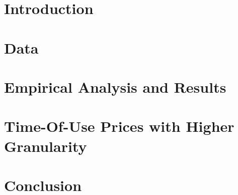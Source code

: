 \section{Introduction}
\label{Section:Introduction}



\section{Data}
\label{Section:Data}



\section{Empirical Analysis and Results}
\label{Section:Empirical-Analysis-and-Results}



\section{Time-Of-Use Prices with Higher Granularity}
\label{Section:Time-Of-Use-Prices-with-Higher-Granularity}



\section{Conclusion}
\label{Section:Conclusion}



\clearpage

